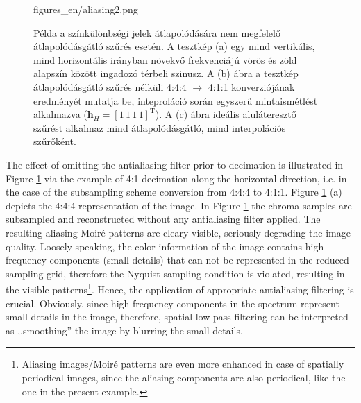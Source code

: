 \begin{figure}[h!]
	\centering
	\begin{overpic}[width = 0.75\columnwidth ]{figures_en/aliasing2.png}
 	\end{overpic}
	\caption{Példa a színkülönbségi jelek átlapolódására nem megfelelő átlapolódásgátló szűrés esetén.
 	A tesztkép (a) egy mind vertikális, mind horizontális irányban növekvő frekvenciájú vörös és zöld alapszín között ingadozó térbeli szinusz.
 	A (b) ábra a tesztkép átlapolódásgátló szűrés nélküli 4:4:4 $\rightarrow$ 4:1:1 konverziójának eredményét mutatja be, inteproláció során egyszerű mintaismétlést alkalmazva ($\mathbf{h}_H= \left[ 1\,1 \,1 \,1 \right]^{\mathrm{T}}$).
	A (c) ábra ideális aluláteresztő szűrést alkalmaz mind átlapolódásgátló, mind interpolációs szűrőként.}
	\label{Fig:chroma_subsampling}
\end{figure}
\vspace{3mm}
The effect of omitting the antialiasing filter prior to decimation is illustrated in Figure \ref{Fig:chroma_subsampling} via the example of 4:1 decimation along the horizontal direction, i.e. in the case of the subsampling scheme conversion from 4:4:4 to 4:1:1.
Figure \ref{Fig:chroma_subsampling} (a) depicts the 4:4:4 representation of the image.
In Figure \ref{Fig:chroma_subsampling} the chroma samples are subsampled and reconstructed without any antialiasing filter applied.
The resulting aliasing Moiré patterns are cleary visible, seriously degrading the image quality.
Loosely speaking, the color information of the image contains high-frequency components (small details) that can not be represented in the reduced sampling grid, therefore the Nyquist sampling condition is violated, resulting in the visible patterns\footnote{Aliasing images/Moiré patterns are even more enhanced in case of spatially periodical images, since the aliasing components are also periodical, like the one in the present example.}.
Hence, the application of appropriate antialiasing filtering is crucial.
Obviously, since high frequency components in the spectrum represent small details in the image, therefore, spatial low pass filtering can be interpreted as ,,smoothing'' the image by blurring the small details.


